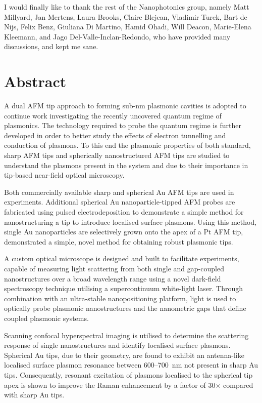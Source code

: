 \documentclass[12pt, a4paper, oneside]{book}
\begin{document}
I would finally like to thank the rest of the Nanophotonics group, namely Matt Millyard, Jan Mertens, Laura Brooks, Claire Blejean, Vladimir Turek, Bart de Nijs, Felix Benz, Giuliana Di Martino, Hamid Ohadi, Will Deacon, Marie-Elena Kleemann, and Jago Del-Valle-Inclan-Redondo, who have provided many discussions, and kept me sane.

\newpage
\section*{Abstract}

A dual AFM tip approach to forming sub-nm plasmonic cavities is adopted to continue work investigating the recently uncovered quantum regime of plasmonics. The technology required to probe the quantum regime is further developed in order to better study the effects of electron tunnelling and conduction of plasmons. To this end the plasmonic properties of both standard, sharp AFM tips and spherically nanostructured AFM tips are studied to understand the plasmons present in the system and due to their importance in tip-based near-field optical microscopy.

Both commercially available sharp and spherical Au AFM tips are used in experiments. Additional spherical Au nanoparticle-tipped AFM probes are fabricated using pulsed electrodeposition to demonstrate a simple method for nanostructuring a tip to introduce localised surface plasmons. Using this method, single Au nanoparticles are selectively grown onto the apex of a Pt AFM tip, demonstrated a simple, novel method for obtaining robust plasmonic tips.

A custom optical microscope is designed and built to facilitate experiments, capable of measuring light scattering from both single and gap-coupled nanostructures over a broad wavelength range using a novel dark-field spectroscopy technique utilising a supercontinuum white-light laser. Through combination with an ultra-stable nanopositioning platform, light is used to optically probe plasmonic nanostructures and the nanometric gaps that define coupled plasmonic systems.

Scanning confocal hyperspectral imaging is utilised to determine the scattering response of single nanostructures and identify localised surface plasmons. Spherical Au tips, due to their geometry, are found to exhibit an antenna-like localised surface plasmon resonance between 600--\SI{700}{nm} not present in sharp Au tips. Consequently, resonant excitation of plasmons localised to the spherical tip apex is shown to improve the Raman enhancement by a factor of 30$\times$ compared with sharp Au tips.
\end{document}
